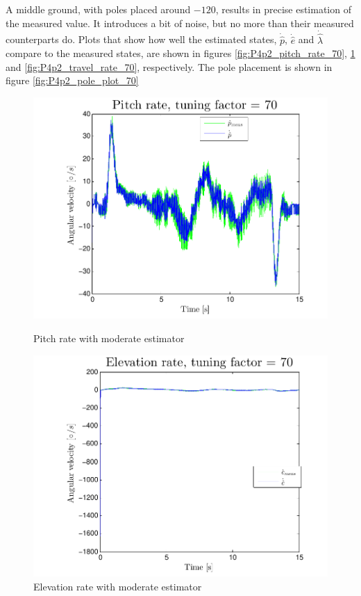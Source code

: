 A middle ground, with poles placed around $-120$, results in precise estimation of the measured value. It introduces a bit of noise, but no more than their measured counterparts do. Plots that show how well the estimated states, $\dot{\hat{p}}$, $\dot{\hat{e}}$ and $\dot{\hat{\lambda}}$ compare to the measured states, are shown in figures \ref{fig:P4p2_pitch_rate_70}, \ref{fig:P4p2_elevation_rate_70} and \ref{fig:P4p2_travel_rate_70}, respectively. The pole placement is shown in figure \ref{fig:P4p2_pole_plot_70} 
\begin{figure}[htb]
    \begin{minipage}{0.5\textwidth}
    	\centering
    	\includegraphics[width=1\textwidth,trim={0cm 0cm 0cm 0cm},clip]{figures/P4p2_pitch_rate_tuning_factor_70.pdf}
    	\caption{Pitch rate with moderate estimator}
        \label{fig:P4p2_pitch_rate_70}
    \end{minipage}    
    \begin{minipage}{0.5\textwidth}
    	\centering
		\includegraphics[width=1\textwidth,trim={0cm 0cm 0cm 0cm},clip]{figures/P4p2_elevation_rate_tuning_factor_70.pdf}
    	\caption{Elevation rate with moderate estimator}
    \label{fig:P4p2_elevation_rate_70}
    \end{minipage}    
\end{figure}
